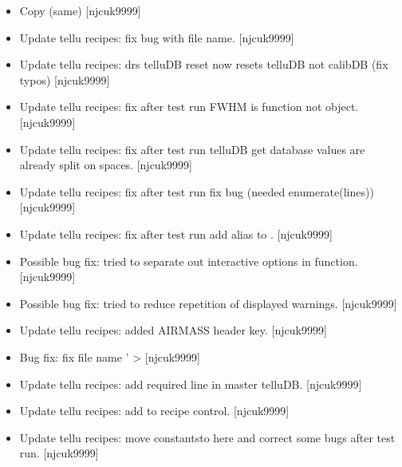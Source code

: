 \documentclass[a4paper,10pt,english]{report}
\begin{document}
\label{\detokenize{misc/changelog:id409}}\begin{itemize}
\item {} 
Copy (same) {[}njcuk9999{]}

\item {} 
Update tellu recipes: fix bug with file name. {[}njcuk9999{]}

\item {} 
Update tellu recipes: drs telluDB reset now resets telluDB not calibDB
(fix typos) {[}njcuk9999{]}

\item {} 
Update tellu recipes: fix after test run FWHM is function not object.
{[}njcuk9999{]}

\item {} 
Update tellu recipes: fix after test run \sphinxhyphen{} telluDB get database values
are already split on spaces. {[}njcuk9999{]}

\item {} 
Update tellu recipes: fix after test run \sphinxhyphen{} fix bug (needed
enumerate(lines)) {[}njcuk9999{]}

\item {} 
Update tellu recipes: fix after test run \sphinxhyphen{} add alias to
. {[}njcuk9999{]}

\item {} 
Possible bug fix: tried to separate out interactive options in
 function. {[}njcuk9999{]}

\item {} 
Possible bug fix: tried to reduce repetition of displayed warnings.
{[}njcuk9999{]}

\item {} 
Update tellu recipes: added AIRMASS header key. {[}njcuk9999{]}

\item {} 
Bug fix: fix file name ’ \textendash{}\textgreater{}
 {[}njcuk9999{]}

\item {} 
Update tellu recipes: add required line in master telluDB. {[}njcuk9999{]}

\item {} 
Update tellu recipes: add  to recipe control.
{[}njcuk9999{]}

\item {} 
Update tellu recipes: move  constantsto here and
correct some bugs after test run. {[}njcuk9999{]}


\end{itemize}
\end{document}
